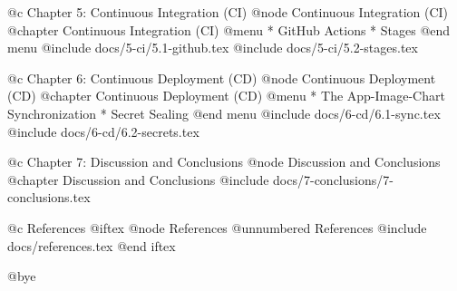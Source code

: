 @c Chapter 5: Continuous Integration (CI)
@node Continuous Integration (CI)
@chapter Continuous Integration (CI)
@menu
* GitHub Actions
* Stages
@end menu
@include docs/5-ci/5.1-github.tex
@include docs/5-ci/5.2-stages.tex

@c Chapter 6: Continuous Deployment (CD)
@node Continuous Deployment (CD)
@chapter Continuous Deployment (CD)
@menu
* The App-Image-Chart Synchronization
* Secret Sealing
@end menu
@include docs/6-cd/6.1-sync.tex
@include docs/6-cd/6.2-secrets.tex

@c Chapter 7: Discussion and Conclusions
@node Discussion and Conclusions
@chapter Discussion and Conclusions
@include docs/7-conclusions/7-conclusions.tex


@c References
@iftex
@node References
@unnumbered References
@include docs/references.tex
@end iftex


@bye
